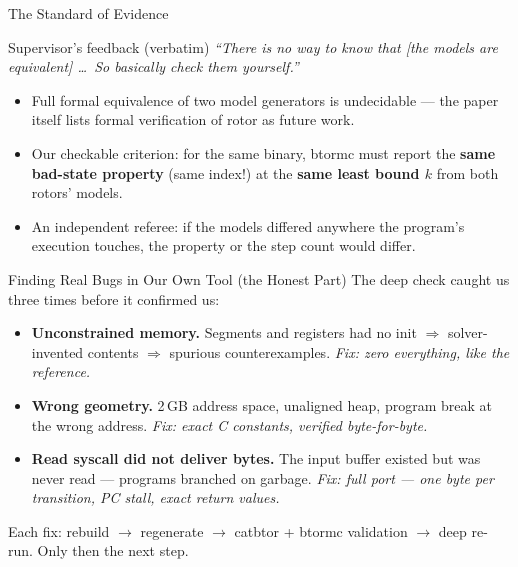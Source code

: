 \documentclass[aspectratio=169]{beamer}
\newcommand{\keylab}[1]{\textbf{\color{blue!55!black}#1}}
\begin{document}
\begin{frame}{The Standard of Evidence}
  \begin{block}{Supervisor's feedback (verbatim)}
    \itshape ``There is no way to know that [the models are
    equivalent] \dots\ So basically check them yourself.''
  \end{block}
  \vspace{0.2cm}
  \begin{itemize}\setlength\itemsep{0.45em}
    \item Full formal equivalence of two model generators is
          undecidable --- the paper itself lists formal verification of
          rotor as future work.
    \item Our checkable criterion: for the same binary, btormc must
          report the \keylab{same bad-state property} (same index!) at
          the \keylab{same least bound $k$} from both rotors' models.
    \item An independent referee: if the models differed anywhere the
          program's execution touches, the property or the step count
          would differ.
  \end{itemize}
\end{frame}

\begin{frame}{Finding Real Bugs in Our Own Tool (the Honest Part)}
  The deep check caught us three times before it confirmed us:
  \vspace{0.15cm}
  \begin{itemize}\setlength\itemsep{0.45em}
    \item \keylab{Unconstrained memory.} Segments and registers had no
          init $\Rightarrow$ solver-invented contents $\Rightarrow$
          spurious counterexamples. \emph{Fix: zero everything, like
          the reference.}
    \item \keylab{Wrong geometry.} 2\,GB address space, unaligned heap,
          program break at the wrong address. \emph{Fix: exact C
          constants, verified byte-for-byte.}
    \item \keylab{Read syscall did not deliver bytes.} The input buffer
          existed but was never read --- programs branched on garbage.
          \emph{Fix: full port --- one byte per transition, PC stall,
          exact return values.}
  \end{itemize}
  \vspace{0.15cm}
  {\footnotesize Each fix: rebuild $\to$ regenerate $\to$ catbtor +
  btormc validation $\to$ deep re-run. Only then the next step.}
\end{frame}
\end{document}
